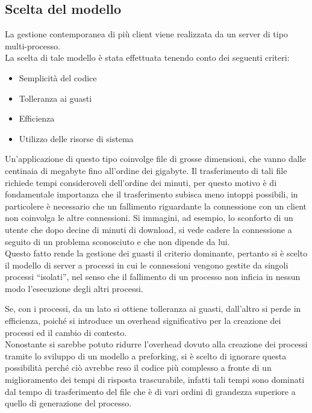 \subsection{Scelta del modello}

La gestione contemporanea di più client viene realizzata da un server di tipo multi-processo.\\
La scelta di tale modello è stata effettuata tenendo conto dei seguenti criteri:
\begin{itemize}
\item Semplicità del codice
\item Tolleranza ai guasti
\item Efficienza
\item Utilizzo delle risorse di sistema
\end{itemize}
Un'applicazione di questo tipo coinvolge file di grosse dimensioni, che vanno dalle centinaia di megabyte fino all'ordine dei gigabyte. Il trasferimento di tali file richiede tempi consideroveli dell'ordine dei minuti, per questo motivo è di fondamentale importanza che il trasferimento subisca meno intoppi possibili, in particolere è necessario che un fallimento riguardante la connessione con un client non coinvolga le altre connessioni. Si immagini, ad esempio, lo sconforto di un utente che dopo decine di minuti di download, si vede cadere la connessione a seguito di un problema sconosciuto e che non dipende da lui.\\
Questo fatto rende la gestione dei guasti il criterio dominante, pertanto si è scelto il modello di server a processi in cui le connessioni vengono gestite da singoli processi ``isolati'', nel senso che il fallimento di un processo non inficia in nessun modo l'esecuzione degli altri processi.

Se, con i processi, da un lato si ottiene tolleranza ai guasti, dall'altro si perde in efficienza, poiché si introduce un overhead significativo per la creazione dei processi ed il cambio di contesto.\\
Nonostante si sarebbe potuto ridurre l'overhead dovuto alla creazione dei processi tramite lo sviluppo di un modello a preforking, si è scelto di ignorare questa possibilità perché ciò avrebbe reso il codice più complesso a fronte di un miglioramento dei tempi di risposta trascurabile, infatti tali tempi sono dominati dal tempo di trasferimento del file che è di vari ordini di grandezza superiore a quello di generazione del processo.
